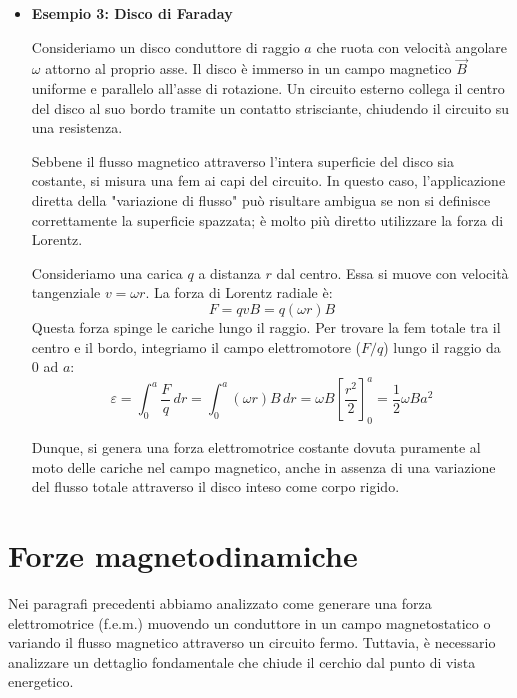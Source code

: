 \documentclass{book}
\begin{document}
\begin{itemize}
Secondo la legge di Lenz, poiché il flusso (verso l'alto) sta aumentando, la corrente indotta dovrà generare un campo magnetico verso il basso per contrastare l'aumento.
Analiticamente, se indichiamo con $x$ la posizione della sbarra, il flusso è $\phi_B = B(xd)$. Derivando rispetto al tempo:
$$\varepsilon = -\frac{\partial \phi_B}{\partial t} = -\frac{\partial}{\partial t} (Bxd) = -B d \frac{dx}{dt} = -B d v$$
Se la sbarra si muovesse verso sinistra, il flusso diminuirebbe e la corrente scorrerebbe nel verso opposto, cercando di sostenere il campo originale.

\item \hypertarget{Es3}{\textbf{Esempio 3: Disco di Faraday }}
Consideriamo un disco conduttore di raggio $a$ che ruota con velocità angolare $\omega$ attorno al proprio asse. Il disco è immerso in un campo magnetico $\vec{B}$ uniforme e parallelo all'asse di rotazione. Un circuito esterno collega il centro del disco al suo bordo tramite un contatto strisciante, chiudendo il circuito su una resistenza.

Sebbene il flusso magnetico attraverso l'intera superficie del disco sia costante, si misura una fem ai capi del circuito. In questo caso, l'applicazione diretta della "variazione di flusso" può risultare ambigua se non si definisce correttamente la superficie spazzata; è molto più diretto utilizzare la forza di Lorentz.

Consideriamo una carica $q$ a distanza $r$ dal centro. Essa si muove con velocità tangenziale $v = \omega r$. La forza di Lorentz radiale è:
$$F = q v B = q (\omega r) B$$
Questa forza spinge le cariche lungo il raggio. Per trovare la fem totale tra il centro e il bordo, integriamo il campo elettromotore ($F/q$) lungo il raggio da $0$ ad $a$:
$$\varepsilon = \int_{0}^{a} \frac{F}{q}\,dr = \int_{0}^{a} (\omega r) B\,dr = \omega B \left[ \frac{r^2}{2} \right]_0^a = \frac{1}{2} \omega B a^2$$

Dunque, si genera una forza elettromotrice costante dovuta puramente al moto delle cariche nel campo magnetico, anche in assenza di una variazione del flusso totale attraverso il disco inteso come corpo rigido.
\end{itemize}


\section{Forze magnetodinamiche}
Nei paragrafi precedenti abbiamo analizzato come generare una forza elettromotrice (f.e.m.) muovendo un conduttore in un campo magnetostatico o variando il flusso magnetico attraverso un circuito fermo.
Tuttavia, è necessario analizzare un dettaglio fondamentale che chiude il cerchio dal punto di vista energetico.
\end{document}
